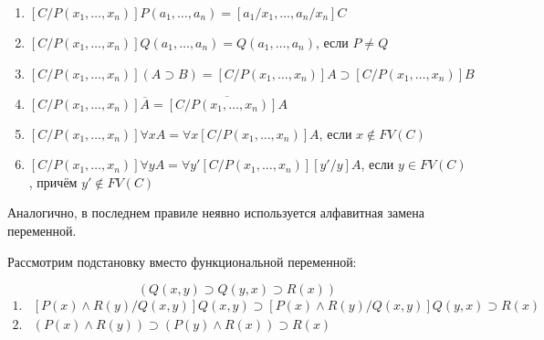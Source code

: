 \begin{enumerate}
    \item $[C/P(x_1,\dots,x_n)]P(a_1,\dots,a_n)=[a_1/x_1,\dots,a_n/x_n]C$
    \item $[C/P(x_1,\dots,x_n)]Q(a_1,\dots,a_n)=Q(a_1,\dots,a_n)$, если $P\ne Q$
    \item $[C/P(x_1,\dots,x_n)](A \supset B)=[C/P(x_1,\dots,x_n)]A \supset [C/P(x_1,\dots,x_n)]B$
    \item $[C/P(x_1,\dots,x_n)]\overline{A} = \overline{[C/P(x_1,\dots,x_n)]A}$
    \item $[C/P(x_1,\dots,x_n)]\forall x A = \forall x [C/P(x_1,\dots,x_n)]A$, если $x \notin FV(C)$
    \item $[C/P(x_1,\dots,x_n)]\forall y A = \forall y' [C/P(x_1,\dots,x_n)] [y'/y]A$, если $y \in FV(C)$, причём $y' \notin FV(C)$
\end{enumerate}

Аналогично, в последнем правиле неявно используется алфавитная замена переменной.

\begin{example}
    Рассмотрим подстановку вместо функциональной переменной:

    \begin{equation*}
        [P(x) \land R(y)/Q(x,y)](Q(x,y) \supset Q(y,x) \supset R(x))
    \end{equation*}
    \begin{equation*}
        \begin{array}{ll}
            1. & [P(x) \land R(y)/Q(x,y)]Q(x,y) \supset [P(x) \land R(y)/Q(x,y)]Q(y,x) \supset R(x)
            \\
            2. & (P(x) \land R(y)) \supset (P(y) \land R(x)) \supset R(x)
        \end{array}
    \end{equation*}

\end{example}